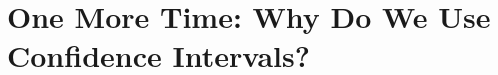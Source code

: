 % 
% 
% 
% 
% 
% 
% 
% 
% 
% 
% 
% 
% 

\section{One More Time:  Why Do We Use Confidence Intervals?}

